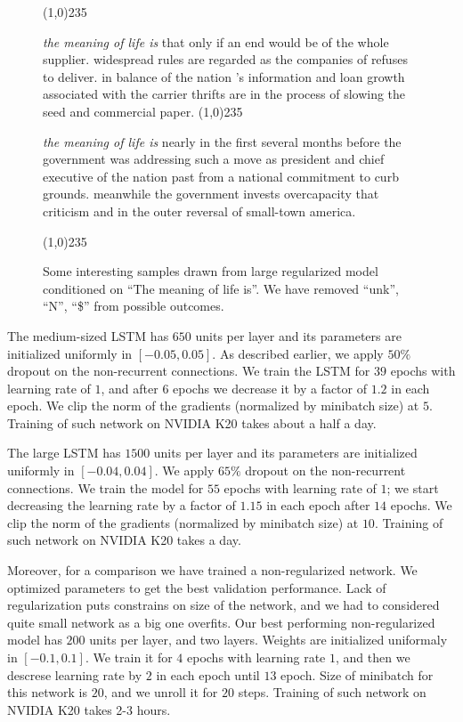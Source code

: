 \documentclass{article}
\begin{document}
\begin{figure}
\line(1,0){235}

  {\footnotesize
  \textit{the meaning of life is} that only if an end would be of the whole supplier. widespread rules are regarded as the companies of refuses to deliver. in balance of the nation 's information and loan growth associated with the carrier thrifts are in the process of slowing the seed and commercial paper.}
\line(1,0){235}

  {\footnotesize
\textit{the meaning of life is} nearly in the first several months before the government was addressing such a move as president and chief executive of the nation past from a national commitment to curb grounds. meanwhile the government invests overcapacity that criticism and in the outer reversal of small-town america.}

\line(1,0){235}
  \caption{Some interesting samples drawn from large regularized model conditioned on ``The meaning of life is''. We have removed ``unk'', ``N'', ``\$'' from possible outcomes.}
  \label{fig:meaning}
\end{figure}

The medium-sized LSTM has $650$ units per layer
and its parameters are initialized uniformly in $[-0.05,
  0.05]$. As described earlier, we apply $50\%$ dropout on the non-recurrent connections. We
train the LSTM for $39$ epochs with learning rate of $1$, and after
$6$ epochs we decrease it by a factor of $1.2$ in each epoch. We
clip the norm of the gradients (normalized by minibatch size) at $5$. 
Training of such network on NVIDIA K20 takes about a half a day.

The large LSTM has $1500$ units per layer and its parameters are
initialized uniformly in $[-0.04, 0.04]$. We apply $65\%$ dropout on
the non-recurrent connections. We train the model for $55$ epochs with
learning rate of $1$; we start decreasing the learning rate by a
factor of $1.15$ in each epoch after $14$ epochs. We clip the norm of
the gradients (normalized by minibatch size) at $10$. Training of such
network on NVIDIA K20 takes a day.

Moreover, for a comparison we have trained a non-regularized network. 
We optimized parameters to get the best validation performance.
Lack of regularization
puts constrains on size of the network, and we had to considered quite small network as a big one overfits. 
Our best performing non-regularized model has $200$ units per layer, and two layers. Weights are initialized
uniformaly in $[-0.1, 0.1]$.
We train it for $4$ epochs 
with learning rate $1$, and then we descrese learning rate by $2$ in each epoch until $13$ epoch.
Size of minibatch for this network is $20$, and we unroll it for $20$ steps. Training of such network
on NVIDIA K20 takes 2-3 hours.
\end{document}

